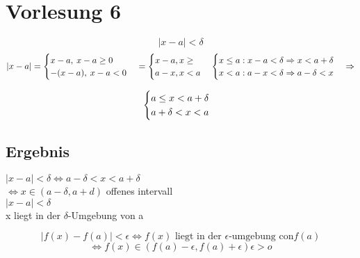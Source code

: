 \section{Vorlesung 6}
\[|x-a| < \delta \]
\begin{equation}
\\|x-a| = \begin{cases}
	x-a , \: x-a \geq 0  \\
	-(x-a),\:  x-a<0 \\
	\end{cases}
 = \begin{cases}
x-a , x \geq \\
a-x , x < a \\
\end{cases}	
 \begin{cases}
  x \leq a : x-a < \delta \Rightarrow x < a+\delta \\
  x<a : a-x < \delta \Rightarrow a-\delta < x	\end{cases} \Rightarrow 
\end{equation}


\begin{equation}
\\ \begin{cases}
a \leq x < a+\delta  \\
a+\delta < x < a \\
\end{cases}
\end{equation}
\subsection{Ergebnis}
$|x-a|<\delta \Leftrightarrow a-\delta < x < a+ \delta$ \\
$\Leftrightarrow x \in (a-\delta , a+d ) $ offenes intervall \\
$|x-a| < \delta$ \\

 
 x liegt in der $\delta $-Umgebung von a
	
\[	|f(x) -f(a)| < \epsilon  \Leftrightarrow f(x)\text{ liegt in der }\epsilon\text{-umgebung con} f(a)
							 \] \[\Leftrightarrow f(x) \in \left( f(a)-\epsilon , f(a)+ \epsilon \right) \epsilon > o	 \]
 
 
